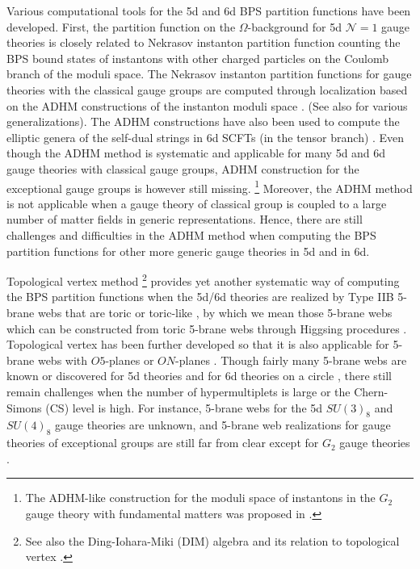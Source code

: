 Various computational tools for the 5d and 6d BPS partition functions have been developed. First, the partition function on the $\Omega$-background for 5d $\mathcal{N}=1$ gauge theories is closely related to Nekrasov instanton partition function counting the BPS bound states of instantons with other charged particles on the Coulomb branch of the moduli space. The Nekrasov instanton partition functions for gauge theories with the classical gauge groups are computed through localization based on the ADHM constructions of the instanton moduli space \cite{Atiyah:1978ri,Nekrasov:2002qd,Nekrasov:2003rj}. (See also \cite{Marino:2004cn,Nekrasov:2004vw,Fucito:2004gi,Hwang:2014uwa} for various generalizations). The ADHM constructions have also been used to compute the elliptic genera of the self-dual strings in 6d SCFTs (in the tensor branch) \cite{Haghighat:2013tka,Kim:2014dza, Haghighat:2014vxa,Gadde:2015tra}. Even though the ADHM method is systematic and applicable for many 5d and 6d gauge theories with classical gauge groups, ADHM construction for the exceptional gauge groups is however still missing.%
\footnote{The ADHM-like construction for the moduli space of instantons in the $G_2$ gauge theory with fundamental matters was proposed in \cite{Kim:2016foj,Kim:2018gjo}.}
Moreover, the ADHM method is not applicable when a gauge theory of classical group is coupled to a large number of matter fields in generic representations. Hence, there are still challenges and difficulties in the ADHM method when computing the BPS partition functions for other more generic gauge theories in 5d and in 6d.

Topological vertex method \cite{Aganagic:2003db,Iqbal:2007ii,Awata:2008ed}\footnote{See also the Ding-Iohara-Miki (DIM) algebra \cite{Ding:1996mq, doi:10.1063/1.2823979} and its relation to topological vertex \cite{Aganagic:2012hs, Awata_2012,Bourgine:2017jsi}.} provides yet another systematic way of computing the BPS partition functions when the 5d/6d theories are realized by Type IIB 5-brane webs that are toric or toric-like \cite{Aharony:1997bh, Benini:2009gi}, by which we mean those 5-brane webs which can be constructed from toric 5-brane webs through Higgsing procedures \cite{Hayashi:2013qwa}. Topological vertex has been further developed so that it is also applicable for 5-brane webs with $O5$-planes \cite{Kim:2017jqn, Hayashi:2020hhb} or $ON$-planes \cite{Bourgine:2017rik, Kim-Wei2020}. Though fairly many 5-brane webs are known or discovered for 5d theories and for 6d theories on a circle \cite{Kim:2015jba, Hayashi:2015fsa, Bergman:2015dpa, Zafrir:2015rga, Hayashi:2015zka, Hayashi:2015vhy, Zafrir:2015ftn, Zafrir:2016jpu, Hayashi:2018lyv, Hayashi:2019yxj, Kim:2019dqn}, there still remain challenges when the number of hypermultiplets is large or the Chern-Simons (CS) level is high. For instance, 5-brane webs for the 5d $SU(3)_8$ and $SU(4)_8$ gauge theories are unknown, and 5-brane web realizations for gauge theories of exceptional groups are still far from clear except for $G_2$ gauge theories \cite{Hayashi:2018bkd,Kim:2019dqn}. 

